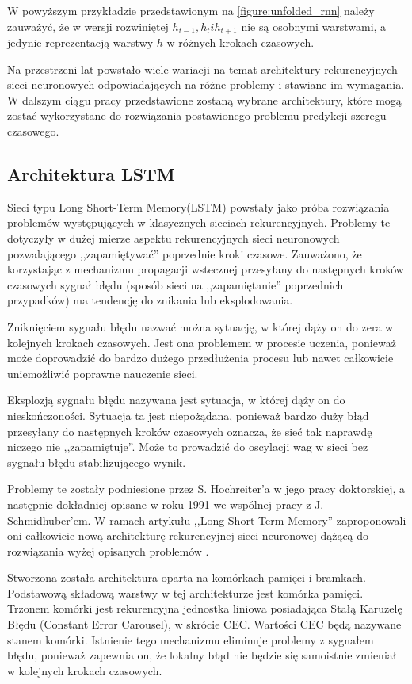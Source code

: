 \documentclass[10pt,a4paper]{article}
\begin{document}
W powyższym przykładzie przedstawionym na \autoref{figure:unfolded_rnn} należy zauważyć, że w wersji rozwiniętej $h_{t-1}, h_t i h_{t+1}$ nie są osobnymi warstwami, a jedynie reprezentacją warstwy $h$ w różnych krokach czasowych. 

Na przestrzeni lat powstało wiele wariacji na temat architektury rekurencyjnych sieci neuronowych odpowiadających na różne problemy i stawiane im wymagania. W dalszym ciągu pracy przedstawione zostaną wybrane architektury, które mogą zostać wykorzystane do rozwiązania postawionego problemu predykcji szeregu czasowego.


\subsection{Architektura LSTM}
Sieci typu Long Short-Term Memory(LSTM) powstały jako próba rozwiązania problemów występujących w klasycznych sieciach rekurencyjnych. Problemy te dotyczyły w dużej mierze aspektu rekurencyjnych sieci neuronowych pozwalającego ,,zapamiętywać'' poprzednie kroki czasowe. Zauważono, że korzystając z mechanizmu propagacji wstecznej przesyłany do następnych kroków czasowych sygnał błędu (sposób sieci na ,,zapamiętanie'' poprzednich przypadków) ma tendencję do znikania lub eksplodowania. 

Zniknięciem sygnału błędu nazwać można sytuację, w której dąży on do zera w kolejnych krokach czasowych. Jest ona problemem w procesie uczenia, ponieważ może doprowadzić do bardzo dużego przedłużenia procesu lub nawet całkowicie uniemożliwić poprawne nauczenie sieci.

Eksplozją sygnału błędu nazywana jest sytuacja, w której dąży on do nieskończoności. Sytuacja ta jest niepożądana, ponieważ bardzo duży błąd przesyłany do następnych kroków czasowych oznacza, że sieć tak naprawdę niczego nie ,,zapamiętuje''. Może to prowadzić do oscylacji wag w sieci bez sygnału błędu stabilizującego wynik. 

Problemy te zostały podniesione przez S. Hochreiter'a w jego pracy doktorskiej, a następnie dokładniej opisane w roku 1991 we wspólnej pracy z J. Schmidhuber'em. 
W ramach artykułu ,,Long Short-Term Memory'' zaproponowali oni całkowicie nową architekturę rekurencyjnej sieci neuronowej dążącą do rozwiązania wyżej opisanych problemów \cite{hochreiter1997long}.

Stworzona została architektura oparta na komórkach pamięci i bramkach. Podstawową składową warstwy w tej architekturze jest komórka pamięci. Trzonem komórki jest rekurencyjna jednostka liniowa posiadająca Stałą Karuzelę Błędu (Constant Error Carousel), w skrócie CEC. Wartości CEC będą nazywane stanem komórki. Istnienie tego mechanizmu eliminuje problemy z sygnałem błędu, ponieważ zapewnia on, że lokalny błąd nie będzie się samoistnie zmieniał w kolejnych krokach czasowych.
\end{document}
